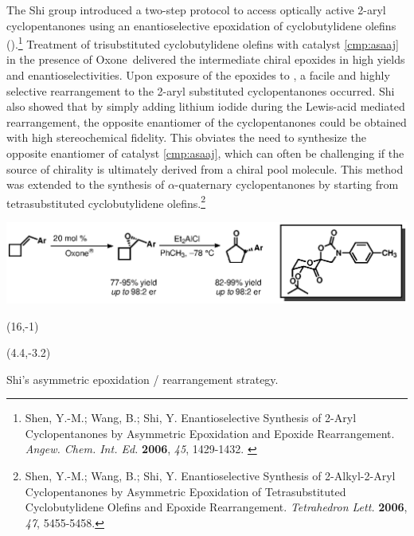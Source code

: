  
 The Shi group introduced a two-step protocol to access optically active
 2-aryl cyclopentanones using an enantioselective epoxidation of
 cyclobutylidene olefins ().\footnote{{\frenchspacing Shen, Y.-M.;
 Wang, B.; Shi, Y.
 Enantioselective Synthesis of 2-Aryl Cyclopentanones by Asymmetric Epoxidation and Epoxide Rearrangement. \textit{Angew. Chem.
 Int. Ed.} \textbf{2006}, \textit{45}, 1429-1432.} \label{ref:asshitertiary}} Treatment of
 trisubstituted cyclobutylidene olefins with catalyst \ref{cmp:asaaj} in the presence of Oxone\regtm\  delivered
 the intermediate chiral epoxides in high yields and enantioselectivities. Upon exposure of the
 epoxides to , a facile and highly selective rearrangement to the 2-aryl substituted
 cyclopentanones occurred. Shi also showed that by simply adding lithium iodide during the
 Lewis-acid mediated rearrangement, the opposite enantiomer of the cyclopentanones could be obtained with high
 stereochemical fidelity. This obviates the need to synthesize the opposite enantiomer of catalyst
 \ref{cmp:asaaj}, which can often be challenging if the source of chirality is ultimately derived
 from a chiral pool molecule. This method was extended to the synthesis of $\alpha$-quaternary
 cyclopentanones by starting from tetrasubstituted cyclobutylidene olefins.\footnote{{\frenchspacing Shen, Y.-M.; Wang, B.; Shi, Y. Enantioselective Synthesis of 2-Alkyl-2-Aryl Cyclopentanones by Asymmetric Epoxidation of Tetrasubstituted Cyclobutylidene Olefins and Epoxide Rearrangement. \textit{Tetrahedron Lett.} \textbf{2006}, \textit{47}, 5455-5458.}} 
 \begin{Scheme}[t]
  \centering
  \includegraphics[scale=0.8]{chp_asymmetric/images/shirearrangement}
  \begin{textblock}{1}(16,-1)  \end{textblock}
  \begin{textblock}{1}(4.4,-3.2)  \end{textblock}
  \caption{Shi's asymmetric epoxidation / rearrangement strategy.}
  \label{sch:asshirearrangement}
\end{Scheme}   
 
